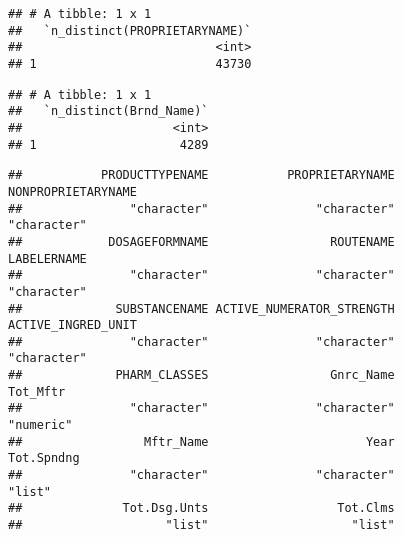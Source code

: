 \documentclass[
]{article}
\newenvironment{Shaded}{\begin{snugshade}}{\end{snugshade}}
\newcommand{\DataTypeTok}[1]{\textcolor[rgb]{0.13,0.29,0.53}{#1}}
\newcommand{\KeywordTok}[1]{\textcolor[rgb]{0.13,0.29,0.53}{\textbf{#1}}}
\newcommand{\NormalTok}[1]{#1}
\newcommand{\OperatorTok}[1]{\textcolor[rgb]{0.81,0.36,0.00}{\textbf{#1}}}
\newcommand{\StringTok}[1]{\textcolor[rgb]{0.31,0.60,0.02}{#1}}
\begin{document}
\begin{Shaded}
\end{Shaded}

\begin{verbatim}
## # A tibble: 1 x 1
##   `n_distinct(PROPRIETARYNAME)`
##                           <int>
## 1                         43730
\end{verbatim}

\begin{Shaded}
\end{Shaded}

\begin{verbatim}
## # A tibble: 1 x 1
##   `n_distinct(Brnd_Name)`
##                     <int>
## 1                    4289
\end{verbatim}

\begin{Shaded}
\end{Shaded}

\begin{verbatim}
##           PRODUCTTYPENAME           PROPRIETARYNAME        NONPROPRIETARYNAME 
##               "character"               "character"               "character" 
##            DOSAGEFORMNAME                 ROUTENAME               LABELERNAME 
##               "character"               "character"               "character" 
##             SUBSTANCENAME ACTIVE_NUMERATOR_STRENGTH        ACTIVE_INGRED_UNIT 
##               "character"               "character"               "character" 
##             PHARM_CLASSES                 Gnrc_Name                  Tot_Mftr 
##               "character"               "character"                 "numeric" 
##                 Mftr_Name                      Year                Tot.Spndng 
##               "character"               "character"                    "list" 
##              Tot.Dsg.Unts                  Tot.Clms 
##                    "list"                    "list"
\end{verbatim}
\end{document}
